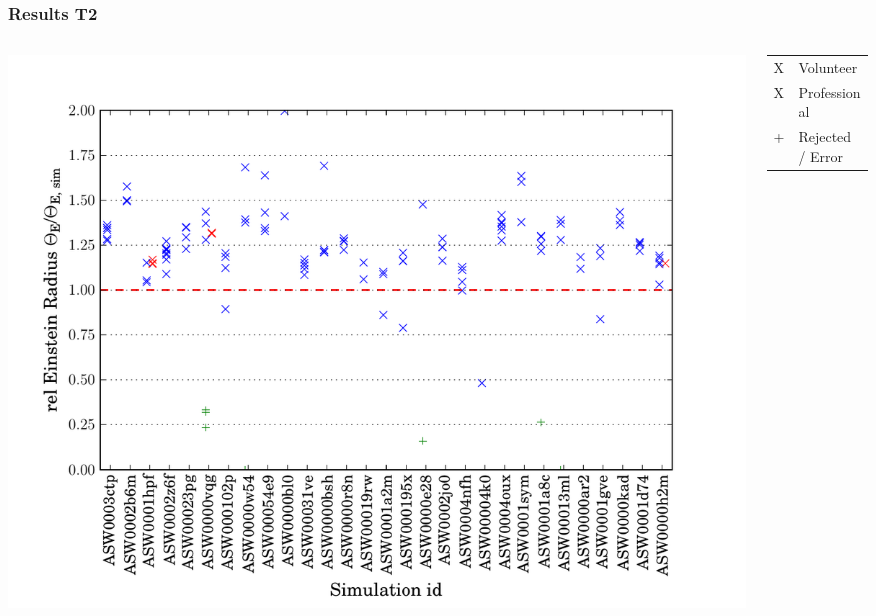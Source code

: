 \documentclass[aspectratio=1610]{beamer}
\begin{document}
\begin{frame}
  \frametitle{Results T2}
  \begin{columns}[c]\begin{column}{0.66\textwidth}
    \includegraphics[height=0.9\textheight]{imgs/eR_4}
  \end{column}\begin{column}{0.33\textwidth}
    \begin{tabular}{ll}
      {\color{blue}X} & Volunteer\\
      {\color{red}X} & Professional\\
      {\color{green}+} & Rejected / Error\\
    \end{tabular}
  \end{column}\end{columns}
\end{frame}
\end{document}

